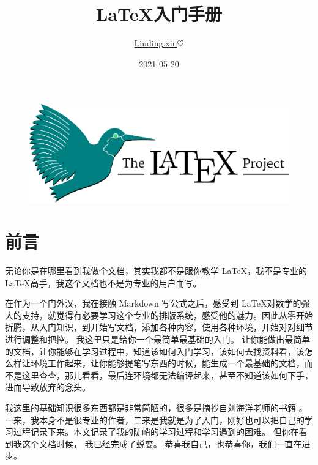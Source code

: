 \documentclass[UTF8,AutoFakeBold]{ctexart}
\numberwithin{figure}{section}
\numberwithin{table}{section}
\begin{document}
\title{ \LaTeX 入门手册}
\author{ \href{liuding.xin}{Liuding.xin}$\heartsuit$}
\date{2021-05-20}


\begin{titlepage}
    \maketitle %
    \begin{figure}[htbp]
        \centering
        \includegraphics[scale=0.4,angle=-50]{images/1200px_LaTeX_project_logo_bird.svg.png}
    \end{figure}
\end{titlepage}

\tableofcontents

\listoffigures

\listoftables

\clearpage

\section*{前言}

无论你是在哪里看到我做个文档，其实我都不是跟你教学 \LaTeX ，我不是专业的 \LaTeX 高手，我这个文档也不是为专业的用户而写。

在作为一个门外汉，我在接触 Markdown 写公式之后，感受到 \LaTeX 对数学的强大的支持，就觉得有必要学习这个专业的排版系统，感受他的魅力。因此从零开始折腾，从入门知识，到开始写文档，添加各种内容，使用各种环境，开始对对细节进行调整和把控。 我这里只是给你一个最简单最基础的入门。 让你能做出最简单的文档，让你能够在学习过程中，知道该如何入门学习，该如何去找资料看，该怎么样让环境工作起来，让你能够提笔写东西的时候，能生成一个最基础的文档，而不是这里查查，那儿看看，最后连环境都无法编译起来，甚至不知道该如何下手，进而导致放弃的念头。

我这里的基础知识很多东西都是非常简陋的，很多是摘抄自刘海洋老师的书籍 \cite{latex_start}。一来，我本身不是很专业的作者，二来是我就是为了入门，刚好也可以把自己的学习过程记录下来。本文记录了我的陡峭的学习过程和学习遇到的困难。 但你在看到我这个文档时候， 我已经完成了蜕变。 恭喜我自己，也恭喜你，我们一直在进步。
\end{document}
